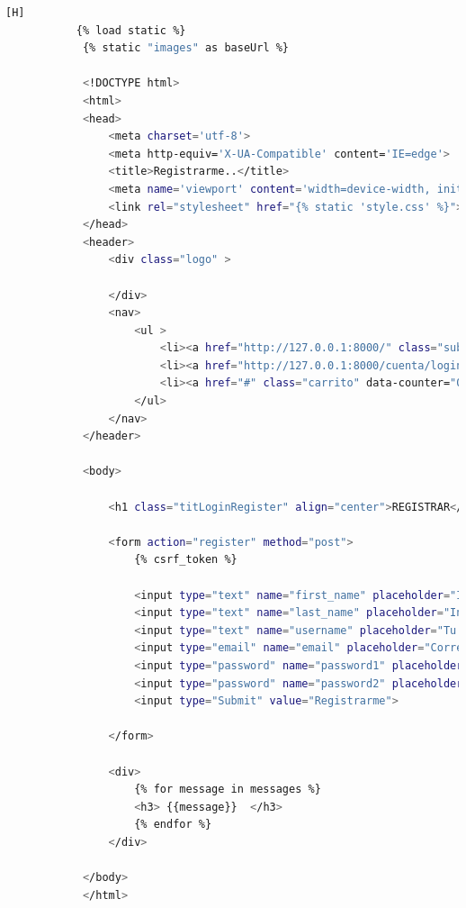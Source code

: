 \documentclass{article}
\begin{document}
        \begin{lstlisting}[language=bash,caption={register.html}][H]
           {% load static %}
            {% static "images" as baseUrl %}
            
            <!DOCTYPE html>
            <html>
            <head>
                <meta charset='utf-8'>
                <meta http-equiv='X-UA-Compatible' content='IE=edge'>
                <title>Registrarme..</title>
                <meta name='viewport' content='width=device-width, initial-scale=1'>
                <link rel="stylesheet" href="{% static 'style.css' %}">
            </head>
            <header>
                <div class="logo" >
                   
                </div>
                <nav>
                    <ul >
                        <li><a href="http://127.0.0.1:8000/" class="sub">Pagina principal</a></li>
                        <li><a href="http://127.0.0.1:8000/cuenta/login" class="sub">Login</a></li>
                        <li><a href="#" class="carrito" data-counter="0">&#128722;</a></li>
                    </ul>
                </nav>
            </header>
            
            <body>
            
                <h1 class="titLoginRegister" align="center">REGISTRAR</h1>
            
                <form action="register" method="post">
                    {% csrf_token %}
            
                    <input type="text" name="first_name" placeholder="Ingresa tus nombres"><br>
                    <input type="text" name="last_name" placeholder="Ingresa Apellidos"><br>
                    <input type="text" name="username" placeholder="Tu usuario: "><br>
                    <input type="email" name="email" placeholder="Correo: "><br>
                    <input type="password" name="password1" placeholder="Contraseña"><br>
                    <input type="password" name="password2" placeholder="Vuelve a escribir la contraseña"><br>
                    <input type="Submit" value="Registrarme">
            
                </form>
            
                <div>
                    {% for message in messages %}
                    <h3> {{message}}  </h3>
                    {% endfor %}
                </div>
            
            </body>
            </html>
	\end{lstlisting}
\end{document}
